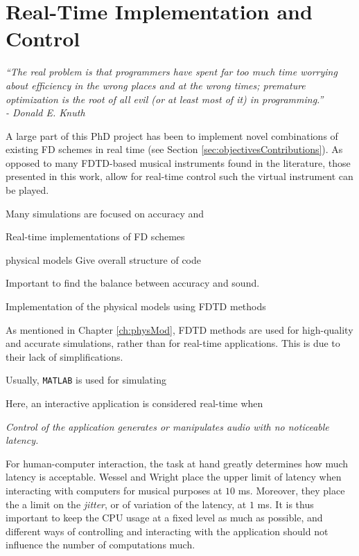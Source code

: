 \chapter{Real-Time Implementation and Control}\label{ch:realtime}

\begin{flushright}{\it
    ``The real problem is that programmers have spent far too much time worrying \\
    about efficiency in the wrong places and at the wrong times; premature\\
    optimization is the root of all evil (or at least most of it) in programming.''\\
    - Donald E. Knuth}
\end{flushright}
%
\vspace{2em}
\noindent A large part of this PhD project has been to implement novel combinations of existing FD schemes in real time (see Section \ref{sec:objectivesContributions}). As opposed to many FDTD-based musical instruments found in the literature, those presented in this work, allow for real-time control such the virtual instrument can be played. 

Many simulations are focused on accuracy and

Real-time implementations of FD schemes 

physical models
Give overall structure of code

Important to find the balance between accuracy and sound. 

Implementation of the physical models
using FDTD methods

As mentioned in Chapter \ref{ch:physMod}, FDTD methods are used for high-quality and accurate simulations, rather than for real-time applications. This is due to their lack of simplifications.

Usually, \texttt{MATLAB} is used for simulating 

Here, an interactive application is considered real-time when
\begin{center}\it
    Control of the application generates or manipulates audio with no noticeable latency.
\end{center}

For human-computer interaction, the task at hand greatly determines how much latency is acceptable. Wessel and Wright \cite{Wessel2002} place the upper limit of latency when interacting with computers for musical purposes at $10$ ms. Moreover, they place the a limit on the \textit{jitter}, or of variation of the latency, at $1$ ms. It is thus important to keep the CPU usage at a fixed level as much as possible, and different ways of controlling and interacting with the application should not influence the number of computations much.

